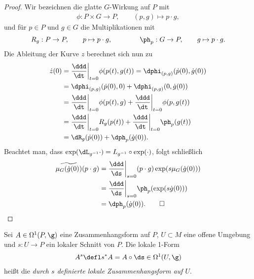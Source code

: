 \documentclass[%
	paper=a5,%
	fleqn,%
	DIV=18,%
	BCOR=0mm,
	fontsize=11pt,
	titlepage=false,%
	bibliography=totoc,
	DIV=18,%
	twoside=true,
	pdftitle=Riemannsche Geometrie,
	pdfauthor=Uwe Semmelmann,
	numbers=noendperiod]%
	{scrbook}
\begin{document}
\begin{proof}
Wir bezeichnen die glatte $G$-Wirkung auf $P$ mit
\begin{align*}
\phi: P\times G\to P,\qquad (p,g)\mapsto p\cdot g,
\end{align*}
und für $p\in P$ und $g\in G$ die Multiplikationen mit
\begin{align*}
R_g : P\to P,\qquad p\mapsto  p\cdot g,\qquad\qquad \ph_p : G\to P,\qquad
g\mapsto p\cdot g.
\end{align*}
Die Ableitung der Kurve $z$ berechnet sich nun zu
\begin{align*}
\dot{z}(0) &= \frac{\ddd}{\dt}\bigg|_{t=0} \phi(p(t),g(t))
= \dphi_{(p,g)}(\dot{p}(0),\dot{g}(0))\\
&= \dphi_{(p,g)}(\dot{p}(0),0) + \dphi_{(p,g)}(0,\dot{g}(0))\\
&= \frac{\ddd}{\dt}\bigg|_{t=0} \phi(p(t),g)
+ \frac{\ddd}{\dt}\bigg|_{t=0} \phi(p,g(t))\\
&= \frac{\ddd}{\dt}\bigg|_{t=0} R_g(p(t))
+ \frac{\ddd}{\dt}\bigg|_{t=0} \ph_p(g(t))\\
&= \dR_g(\dot{p}(0)) + \dph_p(\dot{g}(0)). 
\end{align*}
Beachtet man, dass $\exp(\dL_{g^{-1}} \cdot ) = L_{g^{-1}}\circ \exp(\cdot)$,
folgt schließlich
\begin{align*}
\widetilde{\mu_G(\dot g(0))}(p\cdot g) &= 
\frac{\ddd}{\ds}\bigg|_{s=0} (p\cdot g) \exp(s \mu_G(\dot{g}(0)))\\
&=\frac{\ddd}{\ds}\bigg|_{s=0} \ph_p(\exp(s \dot{g}(0)))\\
&= \dph_p(\dot{g}(0)).\qed
\end{align*}
\end{proof}

\begin{defn}
Sei $A\in\Omega^1(P,\g)$ eine Zusammenhangsform auf $P$, $U\subset M$ eine
offene Umgebung und $s: U\to P$ ein lokaler Schnitt von $P$. Die lokale 1-Form
\begin{align*}
A^s \defl s^* A =  A\circ \ds \in \Omega^1(U,\g)
\end{align*}
heißt die \emph{durch $s$ definierte lokale Zusammenhangsform auf $U$}.\fish
\end{defn}
\end{document}
